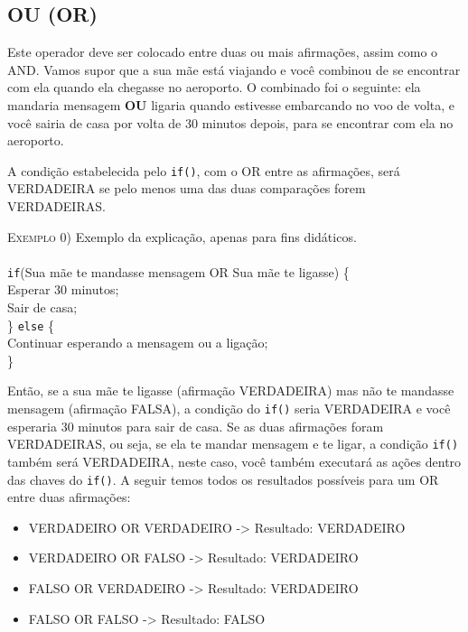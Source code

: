 \subsection{OU (OR)}
    Este operador deve ser colocado entre duas ou mais afirmações, assim como o AND. Vamos supor que a sua mãe está viajando e você combinou de se encontrar com ela quando ela chegasse no aeroporto. O combinado foi o seguinte: ela mandaria mensagem \textbf{OU} ligaria quando estivesse embarcando no voo de volta, e você sairia de casa por volta de 30 minutos depois, para se encontrar com ela no aeroporto.
    
    \begin{center}
        A condição estabelecida pelo \texttt{if()}, com o OR entre as afirmações, será VERDADEIRA se pelo menos uma das duas comparações forem VERDADEIRAS.
    \end{center}
   
    \textsc{Exemplo 0)} Exemplo da explicação, apenas para fins didáticos.
    \\
    \\
    \texttt{if}(Sua mãe te mandasse mensagem OR Sua mãe te ligasse) \{\\
    \indent Esperar 30 minutos;\\
    \indent Sair de casa;\\
    \} \texttt{else} \{\\
    \indent Continuar esperando a mensagem ou a ligação;\\
    \}
     
     Então, se a sua mãe te ligasse (afirmação VERDADEIRA) mas não te mandasse mensagem (afirmação FALSA), a condição do \texttt{if()} seria VERDADEIRA e você esperaria 30 minutos para sair de casa. Se as duas afirmações foram VERDADEIRAS, ou seja, se ela te mandar mensagem e te ligar, a condição \texttt{if()} também será VERDADEIRA, neste caso, você também executará as ações dentro das chaves do \texttt{if()}.
     A seguir temos todos os resultados possíveis para um OR entre duas afirmações:
     
     \begin{itemize}
        \item VERDADEIRO OR VERDADEIRO -> Resultado: VERDADEIRO
        \item VERDADEIRO OR FALSO -> Resultado: VERDADEIRO
        \item FALSO OR VERDADEIRO -> Resultado: VERDADEIRO
        \item FALSO OR FALSO -> Resultado: FALSO
    \end{itemize}
    
